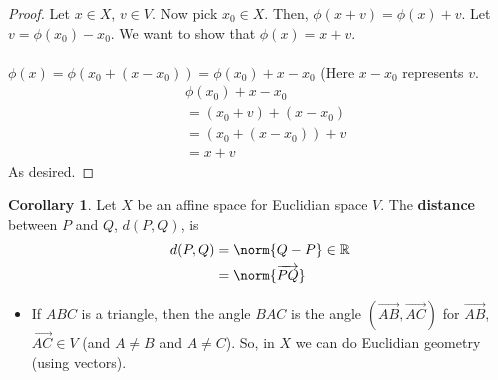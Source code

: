 \documentclass[letterpaper,12pt]{article}
\theoremstyle{definition}
\newtheorem*{corollary}{Corollary}
\renewcommand{\vec}[1]{\overrightarrow{#1}} %
\begin{document}
\begin{proof}
Let $x \in X$, $v \in V$. Now pick $x_0 \in X$. Then, $\phi(x + v) = \phi(x) + v$. Let $v = \phi(x_0) - x_0$. We want to show that $\phi(x) = x + v$.
\\ \\ $\phi(x) = \phi(x_0 + (x - x_0)) = \phi(x_0) + x - x_0$ (Here $x - x_0$ represents $v$.
\begin{align*}
    & \phi(x_0) + x - x_0 \\
    & = (x_0 + v) + (x - x_0) \\
    & = (x_0 + (x - x_0)) + v \\
    & = x + v
\end{align*}
As desired.
\end{proof}

\begin{corollary}
Let $X$ be an affine space for Euclidian space $V$. The \textbf{distance} between $P$ and $Q$, $d(P,Q)$, is
\begin{align*}
    d(P,Q) & = \norm{Q - P} \in \mathbb{R} \\
    & = \norm{\vec{PQ}}
\end{align*}
\begin{itemize}
    \item If $ABC$ is a triangle, then the angle $BAC$ is the angle $(\vec{AB}, \vec{AC})$ for $\vec{AB}$, $\vec{AC} \in V$ (and $A \neq B$ and $A \neq C$). So, in $X$ we can do Euclidian geometry (using vectors).
\end{itemize}
\end{corollary}
\end{document}
